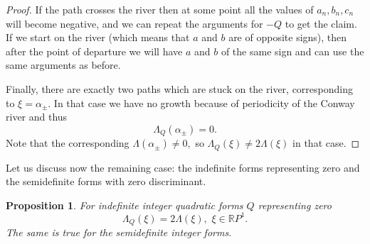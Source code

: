 \documentclass[11pt,reqno]{amsart}
\newtheorem{prop}{Proposition}
\begin{document}
\begin{proof}
If the path crosses the river then at some point all the values of $a_n, b_n, c_n$ will become negative, and we can repeat the arguments for $-Q$ to get the claim. If we start on the river (which means that $a$ and $b$ are of opposite signs), then after the point of departure we will have $a$ and $b$ of the same sign and can use the same arguments as before.

Finally, there are exactly two paths which are stuck on the river, corresponding to $\xi=\alpha_\pm.$ In that case we have no growth because of periodicity of the Conway river \cite{Conway} and thus 
$$
\Lambda_Q(\alpha_\pm)=0.
$$
Note that the corresponding $\Lambda(\alpha_\pm)\neq 0,$ so $\Lambda_Q(\xi)\neq 2\Lambda(\xi)$ in that case.
\end{proof}

Let us discuss now the remaining case: the indefinite forms representing zero and the semidefinite forms with zero discriminant.

\begin{prop}
For indefinite integer quadratic forms $Q$ representing zero $$
\Lambda_Q(\xi)=2\Lambda(\xi),\,\, \xi\in \mathbb RP^1.
$$
The same is true for the semidefinite integer forms.

\end{prop}
\end{document}

